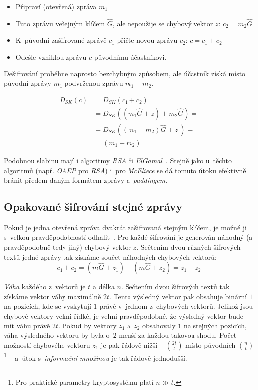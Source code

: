 \documentclass[thesis=M,czech,hidelinks]{FITthesis}[2012/06/26]
\newcommand{\0}{{\textcolor[gray]{0.75}{0}}}
\begin{document}
\begin{itemize}
    \item Připraví (otevřená) zpráva $m_1$
    \item Tuto zprávu  veřejným klíčem $\hat{G}$, ale nepoužije
        se chybový vektor $z$: $c_2 = m_2\hat{G}$
    \item K~původní zašifrované zprávě $c_1$ přičte novou zprávu $c_2$:
        $c = c_1 + c_2$
    \item Odešle vzniklou zprávu $c$ původnímu účastníkovi.
\end{itemize}

Dešifrování proběhne naprosto bezchybným způsobem, ale účastník získá místo
původní zprávy $m_1$ podvrženou zprávu $m_1+m_2$.

\begin{align*}
    D_{SK}\left(c\right) &= D_{SK}\left( c_1 + c_2 \right) = \\
                         &= D_{SK}\left( (m_1\hat{G} + z) + m_2\hat{G} \right) = \\
                         &= D_{SK}\left( (m_1+m_2)\hat{G} + z~\right) = \\
                         &= (m_1+m_2)
\end{align*}

Podobnou slabinu mají i algoritmy \emph{RSA} či \emph{ElGamal}~\cite{FIT_KRY}.
Stejně jako u~těchto algoritmů (např. \emph{OAEP} pro \emph{RSA}) i~pro
\emph{McEliece} se dá tomuto útoku efektivně bránit předem daným formátem zprávy
a~\emph{paddingem}.


\subsection{Opakované šifrování stejné zprávy}

Pokud je jedna otevřená zpráva dvakrát zašifrovaná stejným klíčem, je možné ji
s~velkou pravděpodobností odhalit~\cite{Berson}. Pro každé šifrování je
generován náhodný (a pravděpodobně tedy jiný) chybový vektor $z$. Sečtením dvou
různých šifrových textů jedné zprávy tak získáme součet náhodných chybových
vektorů:
$$ c_1 + c_2 = (m\hat{G} + z_1) + (m\hat{G} + z_2) = z_1 + z_2 $$

\emph{Váha} každého z~vektorů je $t$ a délka $n$. Sečtením dvou šifrových textů
tak získáme vektor váhy maximálně $2t$. Tento výsledný vektor pak obsahuje
binární $1$ na pozicích, kde se vyskytují $1$ právě v~jednom z~chybových
vektorů. Jelikož jsou chybové vektory velmi řídké, je velmi pravděpodobné, že
výsledný vektor bude mít váhu právě $2t$. Pokud by vektory $z_1$ a~$z_2$
obsahovaly $1$ na stejných pozicích, váha výsledného vektoru by byla o~$2$ menší
za každou takovou shodu. Počet možností chybového vektoru $z_1$ je pak řádově
nižší -- $\binom{2t}{t}$ místo původních $\binom{n}{t}$\footnote{
    Pro praktické parametry kryptosystému platí $n \gg t$.
} -- a~útok s~\emph{informační množinou} je tak řádově jednodušší.
\end{document}
